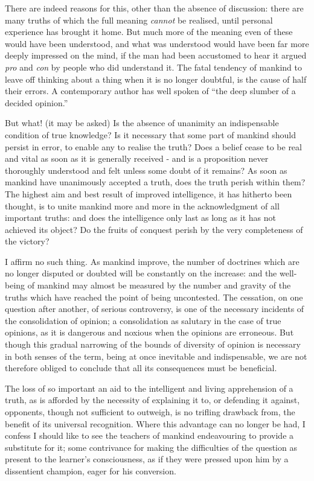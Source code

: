 There are indeed reasons for this, other than the absence of discussion: there are many truths of which the full meaning \textit{cannot} be realised, until personal experience has brought it home. But much more of the meaning even of these would have been understood, and what was understood would have been far more deeply impressed on the mind, if the man had been accustomed to hear it argued \textit{pro} and \textit{con} by people who did understand it. The fatal tendency of mankind to leave off thinking about a thing when it is no longer doubtful, is the cause of half their errors. A contemporary author has well spoken of “the deep slumber of a decided opinion.”\par

But what! (it may be asked) Is the absence of unanimity an indispensable condition of true knowledge? Is it necessary that some part of mankind should persist in error, to enable any to realise the truth? Does a belief cease to be real and vital as soon as it is generally received - and is a proposition never thoroughly understood and felt unless some doubt of it remains? As soon as mankind have unanimously accepted a truth, does the truth perish within them? The highest aim and best result of improved intelligence, it has hitherto been thought, is to unite mankind more and more in the acknowledgment of all important truths: and does the intelligence only last as long as it has not achieved its object? Do the fruits of conquest perish by the very completeness of the victory?\par

I affirm no such thing. As mankind improve, the number of doctrines which are no longer disputed or doubted will be constantly on the increase: and the well-being of mankind may almost be measured by the number and gravity of the truths which have reached the point of being uncontested. The cessation, on one question after another, of serious controversy, is one of the necessary incidents of the consolidation of opinion; a consolidation as salutary in the case of true opinions, as it is dangerous and noxious when the opinions are erroneous. But though this gradual narrowing of the bounds of diversity of opinion is necessary in both senses of the term, being at once inevitable and indispensable, we are not therefore obliged to conclude that all its consequences must be beneficial.\par

The loss of so important an aid to the intelligent and living apprehension of a truth, as is afforded by the necessity of explaining it to, or defending it against, opponents, though not sufficient to outweigh, is no trifling drawback from, the benefit of its universal recognition. Where this advantage can no longer be had, I confess I should like to see the teachers of mankind endeavouring to provide a substitute for it; some contrivance for making the difficulties of the question as present to the learner’s consciousness, as if they were pressed upon him by a dissentient champion, eager for his conversion.\par

